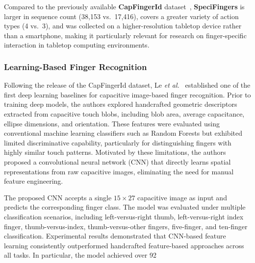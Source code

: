 \documentclass[../main.tex]{subfiles}
\begin{document}
Compared to the previously available \textbf{CapFingerId} dataset~\cite{CapfingerId}, 
\textbf{SpeciFingers} is larger in sequence count (38,153 vs.\ 17,416), covers a greater 
variety of action types (4 vs.\ 3), and was collected on a higher-resolution 
tabletop device rather than a smartphone, making it particularly relevant for 
research on finger-specific interaction in tabletop computing environments.

\subsubsection{Learning-Based Finger Recognition}

Following the release of the CapFingerId dataset, Le \textit{et al.}~\cite{CapfingerId} established one of the first deep learning baselines for capacitive image-based finger recognition. Prior to training deep models, the authors explored handcrafted geometric descriptors extracted from capacitive touch blobs, including blob area, average capacitance, ellipse dimensions, and orientation. These features were evaluated using conventional machine learning classifiers such as Random Forests but exhibited limited discriminative capability, particularly for distinguishing fingers with highly similar touch patterns. Motivated by these limitations, the authors proposed a convolutional neural network (CNN) that directly learns spatial representations from raw capacitive images, eliminating the need for manual feature engineering.

The proposed CNN accepts a single $15 \times 27$ capacitive image as input and predicts the corresponding finger class. The model was evaluated under multiple classification scenarios, including left-versus-right thumb, left-versus-right index finger, thumb-versus-index, thumb-versus-other fingers, five-finger, and ten-finger classification. Experimental results demonstrated that CNN-based feature learning consistently outperformed handcrafted feature-based approaches across all tasks. In particular, the model achieved over 92%
\end{document}
